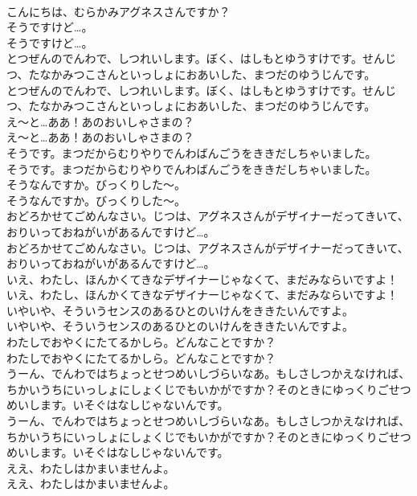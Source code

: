 \documentclass[8pt]{extreport}
\begin{document}
\begin{CJK}{UTF8}{min}
\\	こんにちは、むらかみアグネスさんですか？ 
\\	そうですけど…。	
\\	そうですけど…。 
\\	とつぜんのでんわで、しつれいします。ぼく、はしもとゆうすけです。せんじつ、たなかみつこさんといっしょにおあいした、まつだのゆうじんです。	
\\	とつぜんのでんわで、しつれいします。ぼく、はしもとゆうすけです。せんじつ、たなかみつこさんといっしょにおあいした、まつだのゆうじんです。 
\\	え～と…ああ！あのおいしゃさまの？	
\\	え～と…ああ！あのおいしゃさまの？ 
\\	そうです。まつだからむりやりでんわばんごうをききだしちゃいました。	
\\	そうです。まつだからむりやりでんわばんごうをききだしちゃいました。 
\\	そうなんですか。びっくりした～。	
\\	そうなんですか。びっくりした～。 
\\	おどろかせてごめんなさい。じつは、アグネスさんがデザイナーだってきいて、おりいっておねがいがあるんですけど…。	
\\	おどろかせてごめんなさい。じつは、アグネスさんがデザイナーだってきいて、おりいっておねがいがあるんですけど…。 
\\	いえ、わたし、ほんかくてきなデザイナーじゃなくて、まだみならいですよ！	
\\	いえ、わたし、ほんかくてきなデザイナーじゃなくて、まだみならいですよ！ 
\\	いやいや、そういうセンスのあるひとのいけんをききたいんですよ。	
\\	いやいや、そういうセンスのあるひとのいけんをききたいんですよ。 
\\	わたしでおやくにたてるかしら。どんなことですか？	
\\	わたしでおやくにたてるかしら。どんなことですか？ 
\\	うーん、でんわではちょっとせつめいしづらいなあ。もしさしつかえなければ、ちかいうちにいっしょにしょくじでもいかがですか？そのときにゆっくりごせつめいします。いそぐはなしじゃないんです。	
\\	うーん、でんわではちょっとせつめいしづらいなあ。もしさしつかえなければ、ちかいうちにいっしょにしょくじでもいかがですか？そのときにゆっくりごせつめいします。いそぐはなしじゃないんです。 
\\	ええ、わたしはかまいませんよ。	
\\	ええ、わたしはかまいませんよ。 

\end{CJK}
\end{document}

